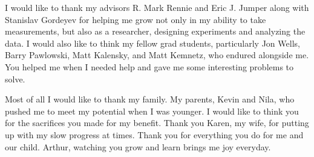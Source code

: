 I would like to thank my advisors R. Mark Rennie and Eric J. Jumper along with Stanislav Gordeyev for helping me grow not only in my ability to take measurements, but also as a researcher, designing experiments and analyzing the data.
I would also like to think my fellow grad students, particularly Jon Wells, Barry Pawlowski, Matt Kalensky, and Matt Kemnetz, who endured alongside me.
You helped me when I needed help and gave me some interesting problems to solve.

Most of all I would like to thank my family.
My parents, Kevin and Nila, who pushed me to meet my potential when I was younger.
I would like to think you for the sacrifices you made for my benefit.
Thank you Karen, my wife, for putting up with my slow progress at times.
Thank you for everything you do for me and our child.
Arthur, watching you grow and learn brings me joy everyday.

